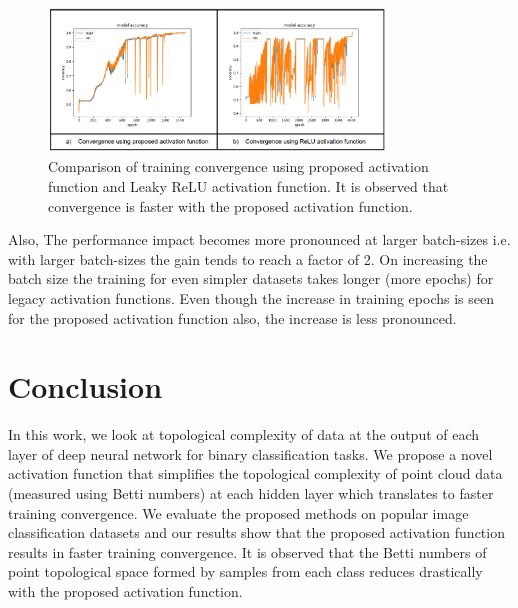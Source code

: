 \documentclass[wcp]{jmlr}
\begin{document}
\begin{figure}[htp]
\begin{center}
\includegraphics[width=0.8\textwidth]{images/training_convergence.png}
\caption{Comparison of training convergence using proposed activation function and Leaky ReLU activation function. It is observed that convergence is faster with the proposed activation function.}
\label{fig:training_convergence}
\end{center}
\end{figure}

Also, The performance impact becomes more pronounced at larger batch-sizes i.e. with larger batch-sizes the gain tends to reach a factor of 2. On increasing the batch size the training for even simpler datasets takes longer (more epochs) for legacy activation functions. Even though the increase in training epochs  is seen for the proposed activation function also, the increase is less pronounced.

\section{Conclusion}
In this work, we look at topological complexity of data at the output of each layer of deep neural network for binary classification tasks. We propose a novel activation function that simplifies the topological complexity of point cloud data (measured using Betti numbers)  at each hidden layer which translates to faster training convergence. We evaluate the proposed methods on popular image classification datasets and our results show that the proposed activation function results in faster training convergence. It is observed that the  Betti numbers of point topological space formed by samples from each class reduces drastically with the proposed activation function.

%


%
%
%
%
\end{document}

